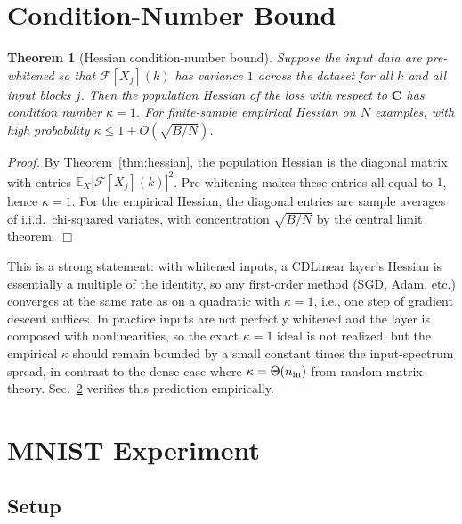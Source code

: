 \documentclass[aps,prx,onecolumn,11pt,nofootinbib,longbibliography]{revtex4-2}
\newtheorem{theorem}{Theorem}
\newcommand{\F}{\mathcal{F}}
\begin{document}
\section{Condition-Number Bound}
\label{sec:cond}

\begin{theorem}[Hessian condition-number bound]
\label{thm:cond}
Suppose the input data are pre-whitened so that
$\F[X_j](k)$ has variance $1$ across the dataset for all $k$ and all
input blocks $j$.  Then the population Hessian of the loss with respect to
$\mathbf{C}$ has condition number $\kappa = 1$.
For finite-sample empirical Hessian on $N$ examples, with high probability
$\kappa \leq 1 + O(\sqrt{B/N})$.
\end{theorem}

\textit{Proof.}  By Theorem~\ref{thm:hessian}, the population Hessian is
the diagonal matrix with entries $\mathbb{E}_X|\F[X_j](k)|^2$.  Pre-whitening
makes these entries all equal to $1$, hence
$\kappa = 1$.  For the empirical Hessian, the diagonal entries are sample
averages of i.i.d.~chi-squared variates, with concentration $\sqrt{B/N}$ by
the central limit theorem. $\Box$

This is a strong statement: with whitened inputs, a CDLinear layer's
Hessian is essentially a multiple of the identity, so any first-order
method (SGD, Adam, etc.) converges at the same rate as on a quadratic with
$\kappa = 1$, i.e., one step of gradient descent suffices.  In practice
inputs are not perfectly whitened and the layer is composed with
nonlinearities, so the exact $\kappa = 1$ ideal is not realized, but the
empirical $\kappa$ should remain bounded by a small constant times the
input-spectrum spread, in contrast to the dense case where
$\kappa = \Theta(n_{\rm in})$ from random matrix theory.  Sec.~\ref{sec:mnist}
verifies this prediction empirically.

\section{MNIST Experiment}
\label{sec:mnist}

\subsection{Setup}
\end{document}
